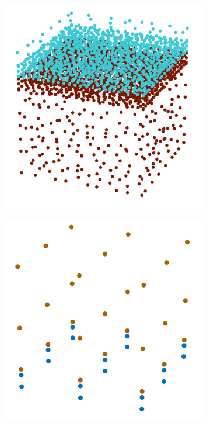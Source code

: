 \begin{figure}[htb]
\begin{subfigure}[t]{.225\textwidth}
		\includegraphics[width=\linewidth]{figures/cube_type_dp.png}
		\caption{}\label{fig:type_dp}
	\end{subfigure}\hspace{1.0em}%
	\begin{subfigure}[t]{.225\textwidth}
		\centering
		\includegraphics[width=\linewidth]{figures/cube_size_dp.png}

\end{subfigure}
\end{figure}
